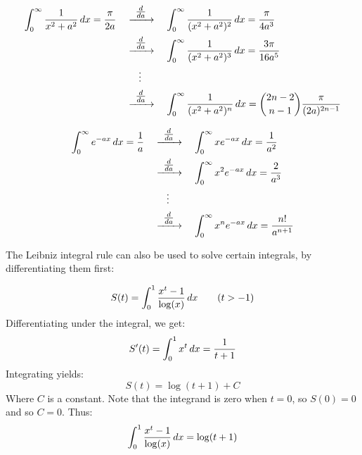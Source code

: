 \documentclass[main.tex]{subfiles}
\begin{document}
\begin{example}
    \begin{align*}
        \int_0^\infty \frac{1}{x^2+a^2}\,dx = \frac{\pi}{2a}
        &\quad\xrightarrow{\hspace{1ex}\tfrac{d}{da}\hspace{1ex}}\quad
        \int_0^\infty \frac{1}{(x^2+a^2)^2}\,dx = \frac{\pi}{4a^3} \\
        &\quad\xrightarrow{\hspace{1ex}\tfrac{d}{da}\hspace{1ex}}\quad
        \int_0^\infty \frac{1}{(x^2+a^2)^3}\,dx = \frac{3\pi}{16a^5} \\
        &\qquad\;\vdots \\
        &\quad\xrightarrow{\hspace{1ex}\tfrac{d}{da}\hspace{1ex}}\quad
        \int_0^\infty \frac{1}{(x^2+a^2)^n}\,dx = \binom{2n-2}{n-1}\frac{\pi}{(2a)^{2n-1}}
    \end{align*}
\end{example}

\begin{example}
    \begin{align*}
        \int_0^\infty e^{-ax}\,dx = \frac{1}{a}
        &\quad\xrightarrow{\hspace{1ex}\tfrac{d}{da}\hspace{1ex}}\quad
        \int_0^\infty xe^{-ax}\,dx = \frac{1}{a^2} \\
        &\quad\xrightarrow{\hspace{1ex}\tfrac{d}{da}\hspace{1ex}}\quad
        \int_0^\infty x^2e^{-ax}\,dx = \frac{2}{a^3} \\
        &\qquad\;\vdots \\
        &\quad\xrightarrow{\hspace{1ex}\tfrac{d}{da}\hspace{1ex}}\quad
        \int_0^\infty x^ne^{-ax}\,dx = \frac{n!}{a^{n+1}}
    \end{align*}
\end{example}

The Leibniz integral rule can also be used to solve certain integrals, by differentiating them first:

\begin{example}
    \begin{equation*}
        S(t) = \int_0^1 \frac{x^t-1}{\log(x)}\,dx \tag{$t>-1$}
    \end{equation*}
    Differentiating under the integral, we get:
    \begin{equation*}
        S'(t) = \int_0^1 x^t\,dx = \frac{1}{t+1}
    \end{equation*}
    Integrating yields:
    \begin{equation*}
        S(t) = \log(t+1)+C
    \end{equation*}
    Where $C$ is a constant. Note that the integrand is zero when $t=0$, so $S(0)=0$ and so $C=0$. Thus:
    \begin{equation*}
        \int_0^1 \frac{x^t-1}{\log(x)}\,dx = \log(t+1)
    \end{equation*}
\end{example}
\end{document}
